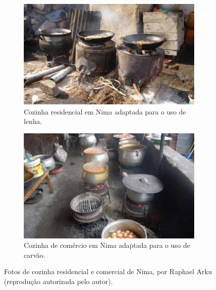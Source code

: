 \begin{frame}
  \frametitle{}
  \begin{figure}[H]
    \centering
    \begin{subfigure}[b]{0.4\linewidth}
      \includegraphics[width=\linewidth]{../../inputs/images/zheng/arku1.jpeg}
      \caption{Cozinha residencial em Nima adaptada para o uso de lenha.}
    \end{subfigure}%
    \hspace{0.5cm}
    \begin{subfigure}[b]{0.4\linewidth}
      \includegraphics[width=\linewidth]{../../inputs/images/zheng/arku2.jpeg}
      \caption{Cozinha de comércio em Nima adaptada para o uso de carvão.}
    \end{subfigure}
    \caption{Fotos de cozinha residencial e comercial de Nima, por Raphael Arku 
             (reprodução autorizada pelo autor). \label{fig:nima}}
  \end{figure}
\end{frame}